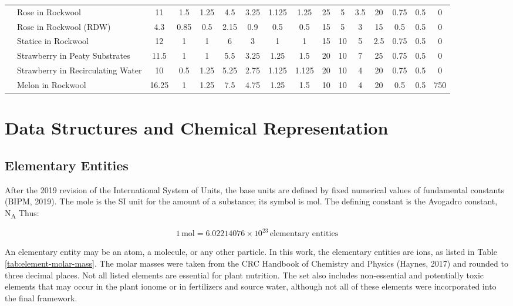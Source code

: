\documentclass[
  letterpaper,
  DIV=11,
  numbers=noendperiod]{scrreprt}
\begin{document}
\begin{landscape}
\begin{longtable}[t]{llcccccccccccccc}
 & Rose in Rockwool & 11 & 1.5 & 1.25 & 4.5 & 3.25 & 1.125 & 1.25 & 25 & 5 & 3.5 & 20 & 0.75 & 0.5 & 0\\
\nopagebreak
 & Rose in Rockwool (RDW) & 4.3 & 0.85 & 0.5 & 2.15 & 0.9 & 0.5 & 0.5 & 15 & 5 & 3 & 15 & 0.5 & 0.5 & 0\\
\nopagebreak
\multirow[t]{-22}{*}{\raggedright\arraybackslash Floriculture} & Statice in Rockwool & 12 & 1 & 1 & 6 & 3 & 1 & 1 & 15 & 10 & 5 & 2.5 & 0.75 & 0.5 & 0\\
\cmidrule{1-16}\pagebreak[0]
 & Strawberry in Peaty Substrates & 11.5 & 1 & 1 & 5.5 & 3.25 & 1.25 & 1.5 & 20 & 10 & 7 & 25 & 0.75 & 0.5 & 0\\
\nopagebreak
 & Strawberry in Recirculating Water & 10 & 0.5 & 1.25 & 5.25 & 2.75 & 1.125 & 1.125 & 20 & 10 & 4 & 20 & 0.75 & 0.5 & 0\\
\nopagebreak
\multirow[t]{-3}{*}{\raggedright\arraybackslash Fruticulture} & Melon in Rockwool & 16.25 & 1 & 1.25 & 7.5 & 4.75 & 1.25 & 1.5 & 10 & 10 & 4 & 20 & 0.5 & 0.5 & 750\\*

\end{longtable}

\endgroup{}
\end{landscape}
\renewcommand{\arraystretch}{1}

\section{Data Structures and Chemical
Representation}\label{data-structures-and-chemical-representation}

\subsection{Elementary Entities}\label{elementary-entities}

After the 2019 revision of the International System of Units, the base
units are defined by fixed numerical values of fundamental constants
(BIPM, 2019). The mole is the SI unit for the amount of a substance; its
symbol is mol. The defining constant is the Avogadro constant,
N\textsubscript{A} Thus:

\begin{equation} 1\,\mathrm{mol} = 6.02214076 \times 10^{23}\,\text{elementary entities} \end{equation}

An elementary entity may be an atom, a molecule, or any other particle.
In this work, the elementary entities are ions, as listed in Table
\ref{tab:element-molar-mass}. The molar masses were taken from the CRC
Handbook of Chemistry and Physics (Haynes, 2017) and rounded to three
decimal places. Not all listed elements are essential for plant
nutrition. The set also includes non-essential and potentially toxic
elements that may occur in the plant ionome or in fertilizers and source
water, although not all of these elements were incorporated into the
final framework.
\end{document}
